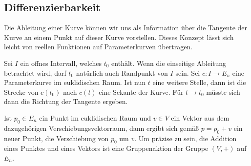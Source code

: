 \subsection{Differenzierbarkeit}
Die Ableitung einer Kurve können wir uns als Information über die
Tangente der Kurve an einem Punkt auf dieser Kurve vorstellen. Dieses
Konzept lässt sich leicht von reellen Funktionen auf Parameterkurven
übertragen.

Sei $I$ ein offnes Intervall, welches $t_0$ enthält. Wenn die einseitige
Ableitung betrachtet wird, darf $t_0$ natürlich auch Randpunkt von $I$
sein. Sei $c\colon I\to E_n$ eine Parameterkurve im euklidischen
Raum. Ist nun $t$ eine weitere Stelle, dann ist die Strecke von
$c(t_0)$ nach $c(t)$ eine Sekante der Kurve. Für $t\to t_0$
müsste sich dann die Richtung der Tangente ergeben.

Ist $p_0\in E_n$ ein Punkt im euklidischen Raum und $v\in V$ ein Vektor
aus dem dazugehörigen Verschiebungsvektorraum, dann ergibt sich
gemäß $p=p_0+v$ ein neuer Punkt, die Verschiebung von $p_0$ um $v$.
Um präzise zu sein, die Addition eines Punktes und eines Vektors ist
eine Gruppenaktion der Gruppe $(V,+)$ auf $E_n$. 

